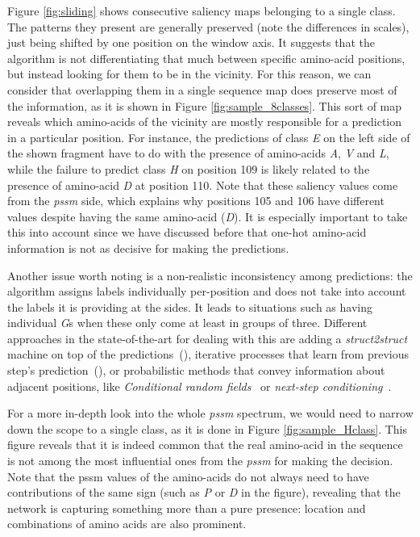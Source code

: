 Figure \ref{fig:sliding} shows consecutive saliency maps belonging to a single class. The patterns they present are generally preserved (note the differences in scales), just being shifted by one position on the window axis. It suggests that the algorithm is not differentiating that much between specific amino-acid positions, but instead looking for them to be in the vicinity. For this reason, we can consider that overlapping them in a single sequence map does preserve most of the information, as it is shown in Figure \ref{fig:sample_8classes}. This sort of map reveals which amino-acids of the vicinity are mostly responsible for a prediction in a particular position. For instance, the predictions of class \textit{E} on the left side of the shown fragment have to do with the presence of amino-acids \textit{A}, \textit{V} and \textit{L}, while the failure to predict class \textit{H} on position 109 is likely related to the presence of amino-acid \textit{D} at position 110. Note that these saliency values come from the \textit{pssm} side, which explains why positions 105 and 106 have different values despite having the same amino-acid (\textit{D}). It is especially important to take this into account since we have discussed before that one-hot amino-acid information is not as decisive for making the predictions.

Another issue worth noting is a non-realistic inconsistency among predictions: the algorithm assigns labels individually per-position and does not take into account the labels it is providing at the sides. It leads to situations such as having individual \textit{G}s when these only come at least in groups of three. Different approaches in the state-of-the-art for dealing with this are adding a \textit{struct2struct} machine on top of the predictions~(\cite{Rost1993,Fang2017}), iterative processes that learn from previous step's prediction~(\cite{Heffernan2017}), or probabilistic methods that convey information about adjacent positions, like \textit{Conditional random fields}~\cite{Wang2016} or \textit{next-step conditioning}~\cite{Busia2017}.

For a more in-depth look into the whole \textit{pssm} spectrum, we would need to narrow down the scope to a single class, as it is done in Figure \ref{fig:sample_Hclass}. This figure reveals that it is indeed common that the real amino-acid in the sequence is not among the most influential ones from the \textit{pssm} for making the decision. Note that the pssm values of the amino-acids do not always need to have contributions of the same sign (such as \textit{P} or \textit{D} in the figure), revealing that the network is capturing something more than a pure presence: location and combinations of amino acids are also prominent.

